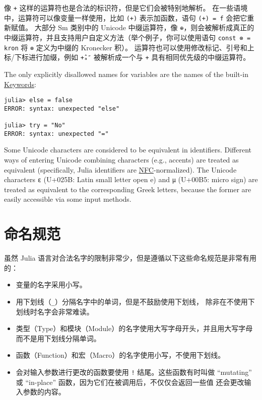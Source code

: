 像 \texttt{+} 这样的运算符也是合法的标识符，但是它们会被特别地解析。 在一些语境中，运算符可以像变量一样使用，比如 \texttt{(+)} 表示加函数，语句 \texttt{(+) = f} 会把它重新赋值。 大部分 Sm 类别中的 Unicode 中缀运算符，像 \texttt{⊕}，则会被解析成真正的中缀运算符，并且支持用户自定义方法（举个例子，你可以使用语句 \texttt{const ⊗ = kron} 将 \texttt{⊗} 定义为中缀的 Kronecker 积）。 运算符也可以使用修改标记、引号和上标/下标进行加缀，例如 \texttt{+̂ₐ″} 被解析成一个与 \texttt{+} 具有相同优先级的中缀运算符。



The only explicitly disallowed names for variables are the names of the built-in \href{@ref}{Keywords}:




\begin{verbatim}
julia> else = false
ERROR: syntax: unexpected "else"

julia> try = "No"
ERROR: syntax: unexpected "="
\end{verbatim}



Some Unicode characters are considered to be equivalent in identifiers. Different ways of entering Unicode combining characters (e.g., accents) are treated as equivalent (specifically, Julia identifiers are \href{http://www.macchiato.com/unicode/nfc-faq}{NFC}-normalized). The Unicode characters \texttt{ɛ} (U+025B: Latin small letter open e) and \texttt{µ} (U+00B5: micro sign) are treated as equivalent to the corresponding Greek letters, because the former are easily accessible via some input methods.



\hypertarget{1519367584459167025}{}


\section{命名规范}



虽然 Julia 语言对合法名字的限制非常少，但是遵循以下这些命名规范是非常有用的：



\begin{itemize}
\item 变量的名字采用小写。


\item 用下划线（\texttt{\_}）分隔名字中的单词，但是不鼓励使用下划线， 除非在不使用下划线时名字会非常难读。


\item 类型（Type）和模块（Module）的名字使用大写字母开头，并且用大写字母 而不是用下划线分隔单词。


\item 函数（Function）和宏（Macro）的名字使用小写，不使用下划线。


\item 会对输入参数进行更改的函数要使用 \texttt{!} 结尾。这些函数有时叫做 “mutating” 或 “in-place” 函数，因为它们在被调用后，不仅仅会返回一些值 还会更改输入参数的内容。

\end{itemize}


